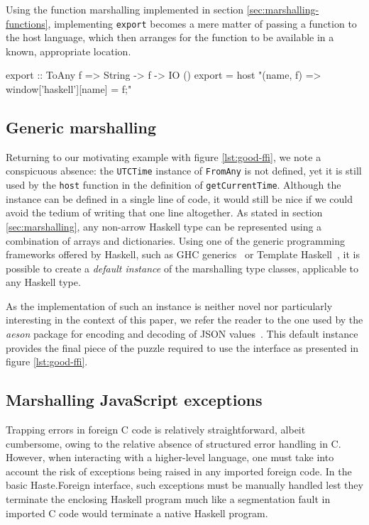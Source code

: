 \documentclass[preprint]{sigplanconf}
\begin{document}
Using the function marshalling implemented in section
\ref{sec:marshalling-functions}, implementing \lstinline!export! becomes a
mere matter of passing a function to the host language, which then
arranges for the function to be available in a known, appropriate location.

\begin{code}
export :: ToAny f => String -> f -> IO ()
export =
  host "(name, f) => window['haskell'][name] = f;"
\end{code}

\subsection{Generic marshalling}
\label{sec:default-instances}
Returning to our motivating example with figure \ref{lst:good-ffi}, we note
a conspicuous absence: the \lstinline!UTCTime! instance of \lstinline!FromAny!
is not defined, yet it is still used by the \lstinline!host! function in the
definition of \lstinline!getCurrentTime!. Although the instance can be defined
in a single line of code, it would still be nice if we could avoid the tedium
of writing that one line altogether. As stated in section
\ref{sec:marshalling}, any non-arrow Haskell type can be represented using
a combination of arrays and dictionaries. Using one of the generic programming
frameworks offered by Haskell, such as GHC generics\ \cite{generics} or
Template Haskell\ \cite{th}, it is possible to create a \emph{default instance}
of the marshalling type classes, applicable to any Haskell type.

As the implementation of such an instance is neither novel nor particularly
interesting in the context of this paper, we refer the reader to the one
used by the \emph{aeson} package for encoding and decoding of
JSON values\ \cite{aeson}. This default instance provides the final piece
of the puzzle required to use the interface as presented in
figure \ref{lst:good-ffi}.


\subsection{Marshalling JavaScript exceptions}
\label{sec:marshalling-exceptions}
Trapping errors in foreign C code is relatively straightforward, albeit
cumbersome, owing to the relative absence of structured error handling in C.
However, when interacting with a higher-level language, one must take into
account the risk of exceptions being raised in any imported foreign code.
In the basic Haste.Foreign interface, such exceptions must be manually handled
lest they terminate the enclosing Haskell program much like a segmentation
fault in imported C code would terminate a native Haskell program.
\end{document}
